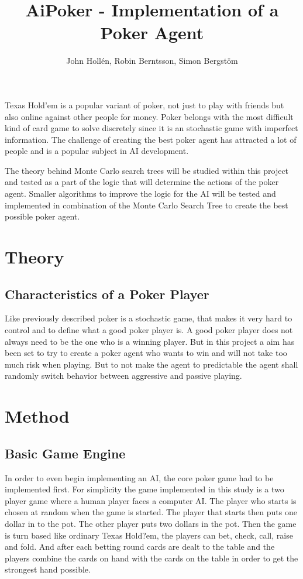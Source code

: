 \documentclass[journal]{vgtc}                %
\title{AiPoker - Implementation of a Poker Agent}
\author{John Holl\'en, Robin Berntsson, Simon Bergst\"om}
\begin{document}

\maketitle 
Texas Hold'em is a popular variant of poker, not just to play with friends but also online against other people for money. Poker belongs with the most difficult kind of card game to solve discretely since it is an stochastic game with imperfect information. The challenge of creating the best poker agent has attracted a lot of people and is a popular subject in AI development.

The theory behind Monte Carlo search trees will be studied within this project and tested as a part of the logic that will determine the actions of the poker agent. Smaller algorithms to improve the logic for the AI will be tested and implemented in combination of the Monte Carlo Search Tree to create the best possible poker agent.

\section{Theory}
\subsection{Characteristics of a Poker Player}
Like previously described poker is a stochastic game, that makes it very hard to control and to define what a good poker player is. A good poker player does not always need to be the one who is a winning player. But in this project a aim has been set to try to create a poker agent who wants to win and will not take too much risk when playing. But to not make the agent to predictable the agent shall randomly switch behavior between aggressive and passive playing. 

\section{Method}
\subsection{Basic Game Engine}
In order to even begin implementing an AI, the core poker game had to be implemented first. For simplicity the game implemented in this study is a two player game where a human player faces a computer AI. The player who starts is chosen at random when the game is started. The player that starts then puts one dollar in to the pot. The other player puts two dollars in the pot. Then the game is turn based like ordinary Texas Hold?em, the players can bet, check, call, raise and fold. And after each betting round cards are dealt to the table and the players combine the cards on hand with the cards on the table in order to get the strongest hand possible. 
\end{document}
